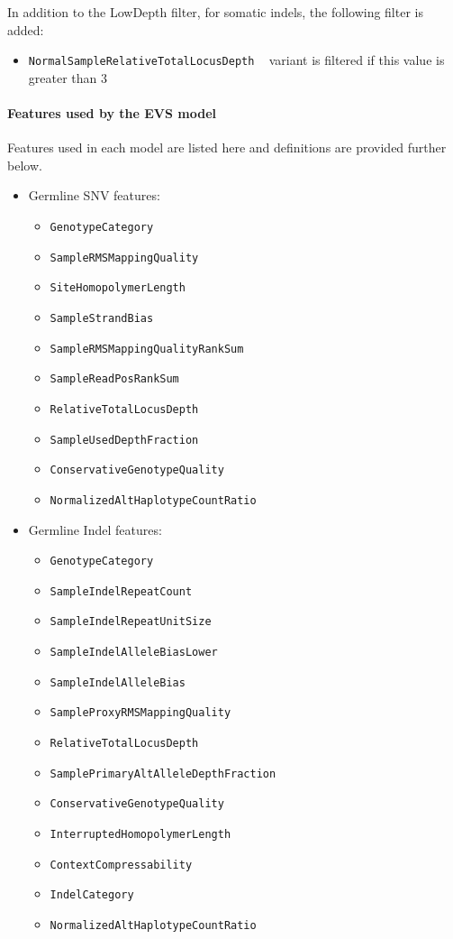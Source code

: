 \documentclass{article}
\begin{document}
In addition to the LowDepth filter, for somatic indels, the following filter is added:

\begin{itemize}
    \item \texttt{NormalSampleRelativeTotalLocusDepth} ~ variant is filtered if this value is greater than 3
\end{itemize}


\paragraph{Features used by the EVS model}

Features used in each model are listed here and definitions are provided further below.

\begin{itemize}
    \item Germline SNV features:
    \begin{itemize}
        \item \texttt{GenotypeCategory}
        \item \texttt{SampleRMSMappingQuality}
        \item \texttt{SiteHomopolymerLength}
        \item \texttt{SampleStrandBias}
        \item \texttt{SampleRMSMappingQualityRankSum}
        \item \texttt{SampleReadPosRankSum}
        \item \texttt{RelativeTotalLocusDepth}
        \item \texttt{SampleUsedDepthFraction}
        \item \texttt{ConservativeGenotypeQuality}
        \item \texttt{NormalizedAltHaplotypeCountRatio}
    \end{itemize}
    \item Germline Indel features:
    \begin{itemize}
        \item \texttt{GenotypeCategory}
        \item \texttt{SampleIndelRepeatCount}
        \item \texttt{SampleIndelRepeatUnitSize}
        \item \texttt{SampleIndelAlleleBiasLower}
        \item \texttt{SampleIndelAlleleBias}
        \item \texttt{SampleProxyRMSMappingQuality}
        \item \texttt{RelativeTotalLocusDepth}
        \item \texttt{SamplePrimaryAltAlleleDepthFraction}
        \item \texttt{ConservativeGenotypeQuality}
        \item \texttt{InterruptedHomopolymerLength}
        \item \texttt{ContextCompressability}
        \item \texttt{IndelCategory}
        \item \texttt{NormalizedAltHaplotypeCountRatio}
    \end{itemize}


\end{itemize}
\end{document}
